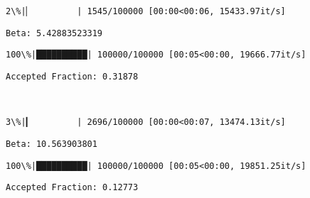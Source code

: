 \documentclass[11pt]{article}
\begin{document}
    \begin{Verbatim}[commandchars=\\\{\}]
  2\%|▏         | 1545/100000 [00:00<00:06, 15433.97it/s]
    \end{Verbatim}

    \begin{Verbatim}[commandchars=\\\{\}]
Beta: 5.42883523319

    \end{Verbatim}

    \begin{Verbatim}[commandchars=\\\{\}]
100\%|██████████| 100000/100000 [00:05<00:00, 19666.77it/s]

    \end{Verbatim}

    \begin{Verbatim}[commandchars=\\\{\}]
Accepted Fraction: 0.31878

    \end{Verbatim}

    \begin{center}
    \end{center}
    { \hspace*{\fill} \\}
    
    \begin{Verbatim}[commandchars=\\\{\}]
  3\%|▎         | 2696/100000 [00:00<00:07, 13474.13it/s]
    \end{Verbatim}

    \begin{Verbatim}[commandchars=\\\{\}]
Beta: 10.563903801

    \end{Verbatim}

    \begin{Verbatim}[commandchars=\\\{\}]
100\%|██████████| 100000/100000 [00:05<00:00, 19851.25it/s]

    \end{Verbatim}

    \begin{Verbatim}[commandchars=\\\{\}]
Accepted Fraction: 0.12773

    \end{Verbatim}
\end{document}
